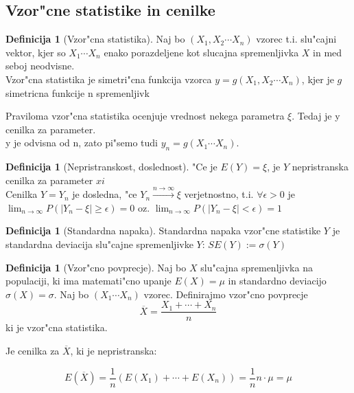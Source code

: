 \documentclass[a4paper,12pt]{article}
\theoremstyle{definition}
\newtheorem{defn}[counter]{Definicija}
\theoremstyle{remark}
\begin{document}
\subsection{Vzor"cne statistike in cenilke}

\begin{defn}[Vzor"cna statistika]
    Naj bo $(X_1, X_2 \cdots X_n)$ vzorec t.i. slu"cajni vektor, kjer so $X_1 \cdots X_n$ enako porazdeljene
    kot slucajna spremenljivka $X$ in med seboj neodvisne. \\
    Vzor"cna statistika je simetri"cna funkcija vzorca $y = g(X_1, X_2 \cdots X_n)$, kjer je $g$ simetricna
    funkcije n spremenljivk
\end{defn}

Praviloma vzor"cna statistika ocenjuje vrednost nekega parametra $\xi$. Tedaj je y cenilka za parameter. \\
y je odvisna od n, zato pi"semo tudi $y_n = g(X_1 \cdots X_n)$. \\

\begin{defn}[Nepristranskost, doslednost]
    "Ce je $E(Y) = \xi$, je $Y$ nepristranska cenilka za parameter $xi$ \\
    Cenilka $Y=Y_n$ je dosledna, "ce $Y_n \stackrel{n \to \infty}{\to} \xi$
    verjetnostno, t.i. $\forall \epsilon > 0$ je $\lim_{n \to \infty} P(|Y_n - \xi| \geq \epsilon) = 0$ oz.
    $\lim_{n \to \infty} P(|Y_n - \xi| < \epsilon) = 1$
\end{defn}

\begin{defn}[Standardna napaka]
    Standardna napaka vzor"cne statistike $Y$ je standardna deviacija slu"cajne spremenljivke $Y$:
    $SE(Y) := \sigma(Y)$
\end{defn}

\begin{defn}[Vzor"cno povprecje]
    Naj bo $X$ slu"cajna spremenljivka na populaciji, ki ima matemati"cno upanje $E(X) = \mu$ in standardno
    deviacijo $\sigma(X) = \sigma$. Naj bo $(X_1 \cdots X_n)$ vzorec. Definirajmo vzor"cno povprecje
    \begin{equation*}
        \overline{X} = \frac{X_1 + \cdots + X_n}{n}
    \end{equation*}
    ki je vzor"cna statistika. \\
\end{defn}

Je cenilka za $\overline{X}$, ki je nepristranska:

\begin{equation*}
    E(\overline{X}) = \frac{1}{n} (E(X_1) + \cdots + E(X_n)) = \frac{1}{n} n \cdot \mu = \mu
\end{equation*}
\end{document}
